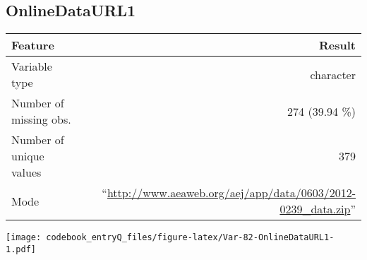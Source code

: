 \documentclass[]{article}
\newcommand{\fullline}{\noindent\makebox[\linewidth]{\rule{\textwidth}{0.4pt}}}
\newcommand{\bminione}{\begin{minipage}{0.75 \textwidth}}
\newcommand{\bminitwo}{\begin{minipage}{0.25 \textwidth}}
\newcommand{\emini}{\end{minipage}}
\begin{document}
\fullline

\hypertarget{onlinedataurl1}{\subsection{OnlineDataURL1}\label{onlinedataurl1}}

\bminione

\begin{longtable}[]{@{}lr@{}}
\toprule
\begin{minipage}[b]{0.28\columnwidth}\raggedright\strut
Feature\strut
\end{minipage} & \begin{minipage}[b]{0.66\columnwidth}\raggedleft\strut
Result\strut
\end{minipage}\tabularnewline
\midrule
\endhead
\begin{minipage}[t]{0.28\columnwidth}\raggedright\strut
Variable type\strut
\end{minipage} & \begin{minipage}[t]{0.66\columnwidth}\raggedleft\strut
character\strut
\end{minipage}\tabularnewline
\begin{minipage}[t]{0.28\columnwidth}\raggedright\strut
Number of missing obs.\strut
\end{minipage} & \begin{minipage}[t]{0.66\columnwidth}\raggedleft\strut
274 (39.94 \%)\strut
\end{minipage}\tabularnewline
\begin{minipage}[t]{0.28\columnwidth}\raggedright\strut
Number of unique values\strut
\end{minipage} & \begin{minipage}[t]{0.66\columnwidth}\raggedleft\strut
379\strut
\end{minipage}\tabularnewline
\begin{minipage}[t]{0.28\columnwidth}\raggedright\strut
Mode\strut
\end{minipage} & \begin{minipage}[t]{0.66\columnwidth}\raggedleft\strut
``\url{http://www.aeaweb.org/aej/app/data/0603/2012-0239_data.zip}''\strut
\end{minipage}\tabularnewline
\bottomrule
\end{longtable}

\emini
\bminitwo
\texttt{[image: codebook\_entryQ\_files/figure-latex/Var-82-OnlineDataURL1-1.pdf]}
\emini
\end{document}
